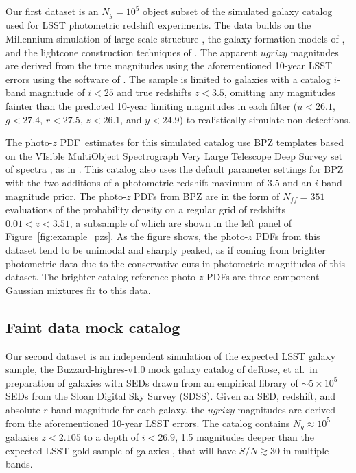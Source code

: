 \documentclass[\docopts]{\docclass}
\newcommand{\pz}{photo-$z$ PDF}
\newcommand{\Ssdata}{Faint\xspace}
\begin{document}
Our first dataset is an $N_{g} = 10^{5}$ object subset of the 
\citet{graham_photometric_2017} simulated galaxy catalog used for LSST 
photometric redshift experiments.
The data builds on the Millennium simulation of large-scale structure 
\citep{springel_simulations_2005}, the galaxy formation models of 
\citet{gonzalez-perez_how_2014}, and the lightcone construction techniques of 
\citet{merson_lightcone_2013}.
The apparent $ugrizy$ magnitudes are derived from the true magnitudes using the 
aforementioned 10-year LSST errors using the software of 
\citet{connolly_end--end_2014}.
The sample is limited to galaxies with a catalog $i$-band magnitude of $i<25$ 
and true redshifts $z<3.5$, omitting any magnitudes fainter than the predicted 
10-year limiting magnitudes in each filter ($u<26.1$, $g<27.4$, $r<27.5$, 
$z<26.1$, and $y<24.9$) to realistically simulate non-detections.

The \pz\ estimates for this simulated catalog use BPZ templates based on the 
VIsible MultiObject Spectrograph Very Large Telescope Deep Survey set of 
spectra \citep{fevre_vimos_2005}, as in \citet{ilbert_accurate_2006}.
This catalog also uses the default parameter settings for BPZ with the two 
additions of a photometric redshift maximum of 3.5 and an $i$-band magnitude 
prior.
The \pz s from BPZ are in the form of $N_{ff} = 351$ evaluations of the 
probability density on a regular grid of redshifts $0.01 < z < 3.51$, a 
subsample of which are shown in the left panel of Figure~\ref{fig:example_pzs}.
As the figure shows, the \pz s from this dataset tend to be unimodal and 
sharply peaked, as if coming from brighter photometric data due to the 
conservative cuts in photometric magnitudes of this dataset.
The brighter catalog reference \pz s are three-component Gaussian mixtures fir 
to this data.

\subsection{\Ssdata data mock catalog}
\label{sec:schmidt}

Our second dataset is an independent simulation of the expected LSST galaxy 
sample, the Buzzard-highres-v1.0 mock galaxy catalog of deRose, et al.\ in 
preparation of galaxies with SEDs drawn from an empirical library of 
$\sim5\times10^{5}$ SEDs from the Sloan Digital Sky Survey (SDSS).
Given an SED, redshift, and absolute $r$-band magnitude for each galaxy, the 
$ugrizy$ magnitudes are derived from the aforementioned 10-year LSST errors.
The catalog contains $N_{g} \approx 10^{5}$ galaxies $z<2.105$ to a depth of 
$i<26.9$, 1.5 magnitudes deeper than the expected LSST gold sample of galaxies 
\citep{lsst_science_collaboration_lsst_2009}, that will have $S/N \gtrsim 30$ 
in multiple bands.
\end{document}
